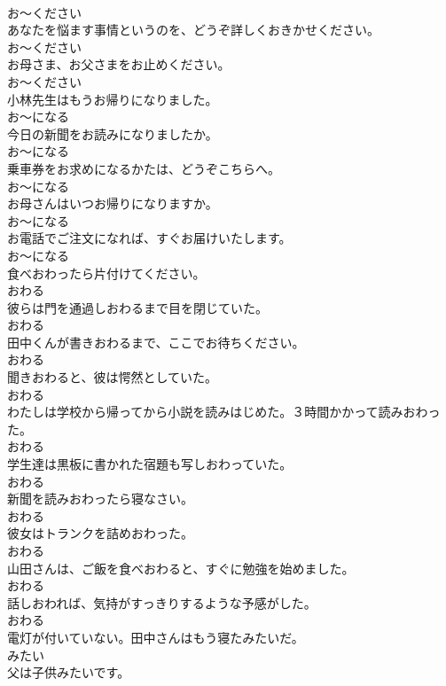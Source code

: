 \documentclass[8pt]{extreport}
\begin{document}
\begin{CJK}{UTF8}{min}
\\	お～ください
\\	あなたを悩ます事情というのを、どうぞ詳しくおきかせください。	
\\	お～ください
\\	お母さま、お父さまをお止めください。	
\\	お～ください
\\	小林先生はもうお帰りになりました。	
\\	お～になる
\\	今日の新聞をお読みになりましたか。	
\\	お～になる
\\	乗車券をお求めになるかたは、どうぞこちらへ。	
\\	お～になる
\\	お母さんはいつお帰りになりますか。	
\\	お～になる
\\	お電話でご注文になれば、すぐお届けいたします。	
\\	お～になる
\\	食べおわったら片付けてください。	
\\	おわる
\\	彼らは門を通過しおわるまで目を閉じていた。	
\\	おわる
\\	田中くんが書きおわるまで、ここでお待ちください。	
\\	おわる
\\	聞きおわると、彼は愕然としていた。	
\\	おわる
\\	わたしは学校から帰ってから小説を読みはじめた。３時間かかって読みおわった。	
\\	おわる
\\	学生達は黒板に書かれた宿題も写しおわっていた。	
\\	おわる
\\	新聞を読みおわったら寝なさい。	
\\	おわる
\\	彼女はトランクを詰めおわった。	
\\	おわる
\\	山田さんは、ご飯を食べおわると、すぐに勉強を始めました。	
\\	おわる
\\	話しおわれば、気持がすっきりするような予感がした。	
\\	おわる
\\	電灯が付いていない。田中さんはもう寝たみたいだ。	
\\	みたい
\\	父は子供みたいです。	

\end{CJK}
\end{document}
